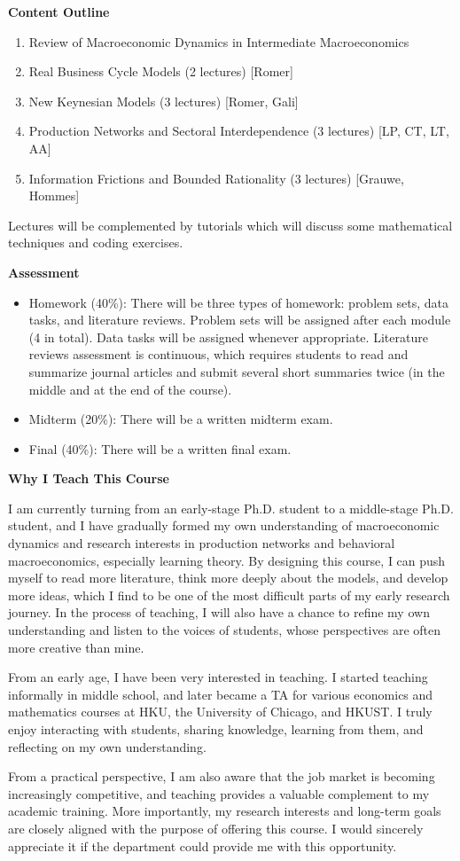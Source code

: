 \documentclass[12pt]{article}
\begin{document}
\newpage
\noindent \textbf{Content Outline}
\begin{enumerate}[label=\arabic*.]
    \item Review of Macroeconomic Dynamics in Intermediate Macroeconomics
    \item Real Business Cycle Models (2 lectures) [Romer]
    \item New Keynesian Models (3 lectures) [Romer, Gali]
    \item Production Networks and Sectoral Interdependence (3 lectures) [LP, CT, LT, AA]
    \item Information Frictions and Bounded Rationality (3 lectures) [Grauwe, Hommes]
\end{enumerate}
Lectures will be complemented by tutorials which will discuss some mathematical techniques and coding exercises.

\vspace{2em}
\noindent \textbf{Assessment}
\begin{itemize}
    \item Homework (40\%): There will be three types of homework: problem sets, data tasks, and literature reviews. Problem sets will be assigned after each module (4 in total). Data tasks will be assigned whenever appropriate. Literature reviews assessment is continuous, which requires students to read and summarize journal articles and submit several short summaries twice (in the middle and at the end of the course).
    \item Midterm (20\%): There will be a written midterm exam.
    \item Final (40\%): There will be a written final exam.
\end{itemize}


\newpage
\noindent \textbf{Why I Teach This Course}

I am currently turning from an early-stage Ph.D. student to a middle-stage Ph.D. student, and I have gradually formed my own understanding of macroeconomic dynamics and research interests in production networks and behavioral macroeconomics, especially learning theory. By designing this course, I can push myself to read more literature, think more deeply about the models, and develop more ideas, which I find to be one of the most difficult parts of my early research journey. In the process of teaching, I will also have a chance to refine my own understanding and listen to the voices of students, whose perspectives are often more creative than mine.

From an early age, I have been very interested in teaching. I started teaching informally in middle school, and later became a TA for various economics and mathematics courses at HKU, the University of Chicago, and HKUST. I truly enjoy interacting with students, sharing knowledge, learning from them, and reflecting on my own understanding.

From a practical perspective, I am also aware that the job market is becoming increasingly competitive, and teaching provides a valuable complement to my academic training. More importantly, my research interests and long-term goals are closely aligned with the purpose of offering this course. I would sincerely appreciate it if the department could provide me with this opportunity.
\end{document}
